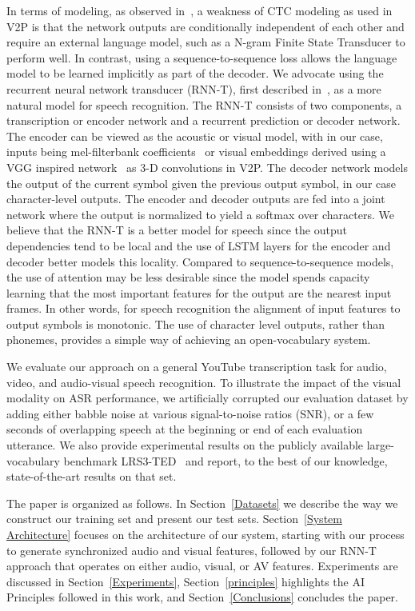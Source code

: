 \documentclass{article}
\newcommand{\citep}{\cite}  \newcommand{\citet}{\cite}  \newcommand{\ytdev}{\textsc{YTDev18}\xspace}
\newcommand{\lrsted}{\textsc{LRS3-TED}\xspace}
\begin{document}
In terms of modeling, as observed
in~\citet{ox_davsr_2018,Afouras2018DeepLR}, a weakness of CTC modeling
as used in V2P is that the network outputs are conditionally
independent of each other and require an external language model, such
as a N-gram Finite State Transducer to perform well. In contrast,
using a sequence-to-sequence loss allows the language model to be
learned implicitly as part of the decoder. We advocate using the
recurrent neural network transducer (RNN-T), first described
in~\citep{rnnt12graves}, as a more natural model for speech
recognition. The RNN-T consists of two components, a transcription or
encoder network and a recurrent prediction or decoder network. The
encoder can be viewed as the acoustic or visual model, with in our
case, inputs being mel-filterbank coefficients~\citet{Davis80} or
visual embeddings derived using a VGG inspired
network~\citet{vgg15simonyan} as 3-D convolutions in V2P. The decoder
network models the output of the current symbol given the previous
output symbol, in our case character-level outputs. The encoder and
decoder outputs are fed into a joint network where the output is
normalized to yield a softmax over characters. We believe that the
RNN-T is a better model for speech since the output dependencies tend
to be local and the use of LSTM layers for the encoder and decoder
better models this locality. Compared to sequence-to-sequence models,
the use of attention may be less desirable since the model spends
capacity learning that the most important features for the output are
the nearest input frames. In other words, for speech recognition the
alignment of input features to output symbols is monotonic. The use of
character level outputs, rather than phonemes, provides a simple way
of achieving an open-vocabulary system.

We evaluate our approach on a general YouTube transcription task for
audio, video, and audio-visual speech recognition. To illustrate the
impact of the visual modality on ASR performance, we artificially
corrupted our evaluation dataset by adding either babble noise at
various signal-to-noise ratios (SNR), or a few seconds of overlapping
speech at the beginning or end of each evaluation utterance. We also
provide experimental results on the publicly available
large-vocabulary benchmark \lrsted~\citet{lrs3ted} and report, to the
best of our knowledge, state-of-the-art results on that set.

The paper is organized as follows. In Section~\ref{Datasets} we
describe the way we construct our training set and present our
test sets. Section~\ref{System Architecture} focuses on the
architecture of our system, starting with our process to generate
synchronized audio and visual features, followed by our RNN-T approach
that operates on either audio, visual, or AV features. Experiments
are discussed in Section~\ref{Experiments}, Section~\ref{principles}
highlights the AI Principles followed in this work, and
Section~\ref{Conclusions} concludes the paper.
\end{document}
